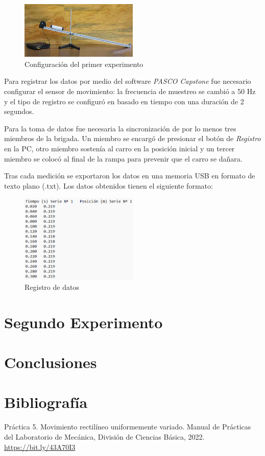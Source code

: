\documentclass[12pt, titlepage]{report}
\begin{document}
    \begin{figure}[ht]
        \centering
        \setcounter{figure}{0}
        \includegraphics[width=0.5\textwidth]{Rampa_Exp1.png}
        \caption{Configuración del primer experimento}
    \end{figure}

    Para registrar los datos por medio del software \textit{PASCO Capstone} fue necesario configurar el sensor de movimiento: la frecuencia de muestreo se cambió a 50 Hz y el tipo de registro se configuró en basado en tiempo con una duración de 2 segundos. 

    Para la toma de datos fue necesaria la sincronización de por lo menos tres miembros de la brigada. Un miembro se encargó de presionar el botón de \textit{Registro} en la PC, otro miembro sostenía al carro en la posición inicial y un tercer miembro se colocó al final de la rampa para prevenir que el carro se dañara.

    Tras cada medición se exportaron los datos en una memoria USB en formato de texto plano (.txt). Los datos obtenidos tienen el siguiente formato:

    \begin{figure}[ht]
        \centering
        \includegraphics[width=0.5\textwidth]{Formato_Datos.png}
        \caption{Registro de datos}
    \end{figure}
    
    

    \section*{Segundo Experimento}


    \newpage
    \section*{Conclusiones}

    \section*{Bibliografía}
    Práctica 5. Movimiento rectilíneo uniformemente variado. Manual de Prácticas del Laboratorio de Mecánica, División de Ciencias Básica, 2022. \url{https://bit.ly/43A70I3}
    
\end{document}
